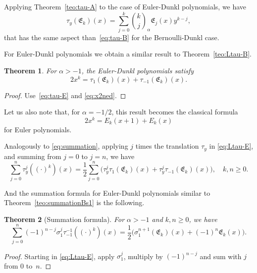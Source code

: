 \documentclass[10pt]{article}
\theoremstyle{plain}
\newtheorem{theorem}{Theorem}[section]
\theoremstyle{definition}
\numberwithin{equation}{section} %
\newcommand{\binoma}[2]{\binom{#1}{#2}_{\!\alpha}}
\newcommand{\E}{\mathfrak{E}}
\begin{document}
Applying Theorem~\ref{teo:tau-A} to the case of Euler-Dunkl polynomials, we have 
\begin{equation}
\label{eq:tau-E}
  \tau_y(\E_k)(x)
  = \sum_{j=0}^k \binoma{k}{j} \E_j(x) y^{k-j},
\end{equation}
that has the same aspect than~\eqref{eq:tau-B} for the Bernoulli-Dunkl case.

For Euler-Dunkl polynomials we obtain a similar result to Theorem~\ref{teo:Ltau-B}. 

\begin{theorem}
For $\alpha>-1$, the Euler-Dunkl polynomials satisfy 
\begin{equation}
\label{eq:Ltau-E}
  2x^k = \tau_1(\E_k)(x)+\tau_{-1}(\E_k)(x).
\end{equation}
\end{theorem}

\begin{proof} 
Use~\eqref{eq:tau-E} and \eqref{eq:x2ned}.
\end{proof}

Let us also note that, for $\alpha=-1/2$, this result becomes the classical formula
\[
2x^k = E_k(x+1)+E_k(x)
\]
for Euler polynomials.

Analogously to \eqref{eq:summation}, applying $j$ times the translation $\tau_y$ in \eqref{eq:Ltau-E}, and summing from $j=0$ to $j=n$, we have
\begin{equation*}
  \sum_{j=0}^n \tau_y^j((\cdot)^k)(x)
  = \frac{1}{2} \sum_{j=0}^n \Big(\tau_y^j\tau_1(\E_k)(x)+\tau_y^j\tau_{-1}(\E_k)(x)\Big),
  \quad k,n\ge 0.
\end{equation*}

And the summation formula for Euler-Dunkl polynomials similar to Theorem~\ref{teo:summationBs1} is the following.

\begin{theorem}[Summation formula]
For $\alpha>-1$ and $k,n\ge 0$, we have
\begin{equation}
\label{eq:summationEs1}
  \sum_{j=0}^n (-1)^{n-j} \sigma_1^j\tau_{-1}^{-1}((\cdot)^k)(x)
  = \frac{1}{2} \Big(\sigma_1^{n+1}(\E_k)(x)+(-1)^n\E_k(x)\Big).
\end{equation}
\end{theorem}

\begin{proof}
Starting in \eqref{eq:Ltau-E}, apply $\sigma_1^j$, multiply by $(-1)^{n-j}$ and sum with $j$ from $0$ to~$n$.
\end{proof}
\end{document}
